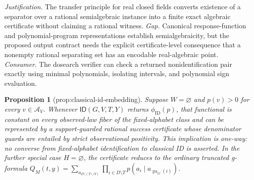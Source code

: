 \documentclass{article}
\newtheorem{proposition}{Proposition}
\begin{document}
\par\smallskip\noindent \textit{Justification.} The transfer principle for real closed fields converts existence of a separator over a rational semialgebraic instance into a finite exact algebraic certificate without claiming a rational witness. \textit{Gap.} Canonical response-function and polynomial-program representations establish semialgebraicity, but the proposed output contract needs the explicit certificate-level consequence that a nonempty rational separating set has an encodable real-algebraic point. \textit{Consumer.} The dosearch verifier can check a returned nonidentification pair exactly using minimal polynomials, isolating intervals, and polynomial sign evaluation.

\begin{proposition}[prop:classical-id-embedding]\label{prop:classical-id-embedding}
Suppose \(W=\varnothing\) and \(p(v)>0\) for every \(v\in\mathcal A_V\). Whenever \(\mathsf{ID}(G,V,T,Y)\) returns \(\phi_{\mathrm{ID}}(p)\), that functional is constant on every observed-law fiber of the fixed-alphabet class and can be represented by a support-guarded rational success certificate whose denominator guards are entailed by strict observational positivity. This implication is one-way: no converse from fixed-alphabet identification to classical ID is asserted. In the further special case \(H=\varnothing\), the certificate reduces to the ordinary truncated g-formula \(Q_M(t,y)=\sum_{a_{D\setminus(T\cup Y)}}\prod_{i\in D\setminus T}p(a_i\mid a_{\operatorname{pa}_G(i)})\).
\end{proposition}
\end{document}
